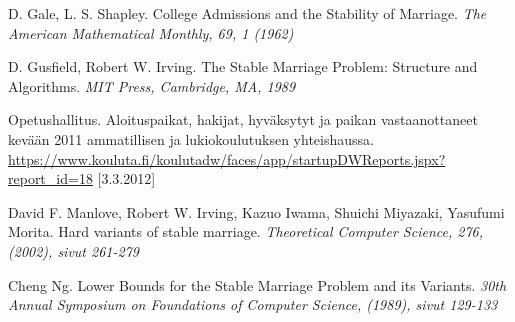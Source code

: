 \documentclass[gradu, twoside]{tktltiki}
\begin{document}
\newpage
\begin{thebibliography}{XXX99}

  D. Gale, L. S. Shapley.
  College Admissions and the Stability of Marriage.
  \emph{The American Mathematical Monthly, 69, 1 (1962)}

  D. Gusfield, Robert W. Irving.
  The Stable Marriage Problem: Structure and Algorithms.
  \emph{MIT Press, Cambridge, MA, 1989}

  Opetushallitus.
  Aloituspaikat, hakijat, hyväksytyt ja paikan vastaanottaneet
  kevään 2011 ammatillisen ja lukiokoulutuksen yhteishaussa.
  \url{https://www.kouluta.fi/koulutadw/faces/app/startupDWReports.jspx?report_id=18}
      [3.3.2012]

  David F. Manlove, Robert W. Irving, Kazuo Iwama, Shuichi Miyazaki,
  Yasufumi Morita.
  Hard variants of stable marriage.
  \emph{Theoretical Computer Science, 276, (2002), sivut 261-279}

  Cheng Ng.
  Lower Bounds for the Stable Marriage Problem and its Variants.
  \emph{30th Annual Symposium on Foundations of Computer Science,
    (1989), sivut 129-133}

\end{thebibliography}
\end{document}
